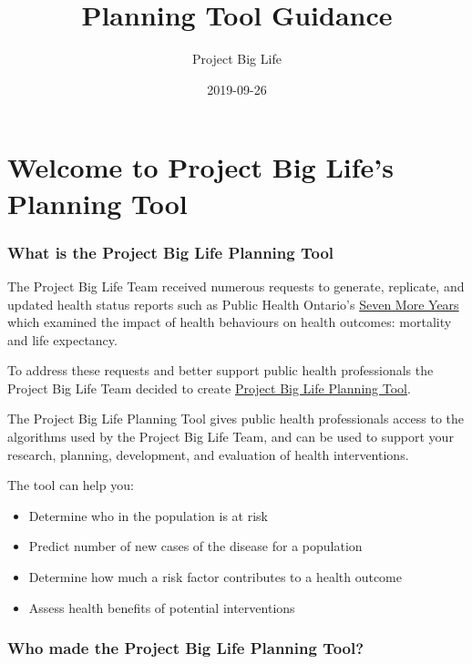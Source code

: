 \documentclass[]{book}
\title{Planning Tool Guidance}
\author{Project Big Life}
\date{2019-09-26}
\providecommand{\tightlist}{%
  \setlength{\itemsep}{0pt}\setlength{\parskip}{0pt}}
\begin{document}
\maketitle

{
\setcounter{tocdepth}{1}
\tableofcontents
}
\chapter{Welcome to Project Big Life's Planning
Tool}\label{welcome-to-project-big-lifes-planning-tool}

\subsection{What is the Project Big Life Planning
Tool}\label{what-is-the-project-big-life-planning-tool}

The Project Big Life Team received numerous requests to generate,
replicate, and updated health status reports such as Public Health
Ontario's
\href{https://www.ices.on.ca/Publications/Atlases-and-Reports/2012/Seven-More-Years}{Seven
More Years} which examined the impact of health behaviours on health
outcomes: mortality and life expectancy.

To address these requests and better support public health professionals
the Project Big Life Team decided to create
\href{http://planning.projectbiglife.ca/}{Project Big Life Planning
Tool}.

The Project Big Life Planning Tool gives public health professionals
access to the algorithms used by the Project Big Life Team, and can be
used to support your research, planning, development, and evaluation of
health interventions.

The tool can help you:

\begin{itemize}
\tightlist
\item
  Determine who in the population is at risk
\item
  Predict number of new cases of the disease for a population
\item
  Determine how much a risk factor contributes to a health outcome
\item
  Assess health benefits of potential interventions
\end{itemize}

\subsection{Who made the Project Big Life Planning
Tool?}\label{who-made-the-project-big-life-planning-tool}
\end{document}
